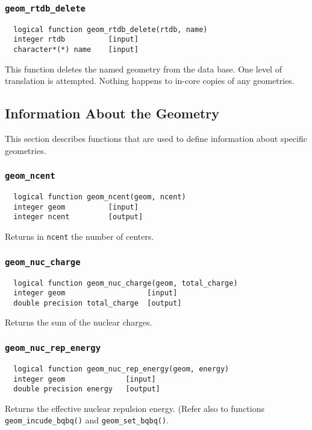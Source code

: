\subsubsection{{\tt geom\_rtdb\_delete}}
\begin{verbatim}
  logical function geom_rtdb_delete(rtdb, name)
  integer rtdb          [input]
  character*(*) name    [input]
\end{verbatim}
This function deletes the named geometry from the data base.  One level of
translation is attempted.  Nothing happens to in-core copies of any
geometries.

\subsection{Information About the Geometry}

This section describes functions that are used to define information about specific
geometries. 

\subsubsection{{\tt geom\_ncent}}
\begin{verbatim}
  logical function geom_ncent(geom, ncent)
  integer geom          [input]
  integer ncent         [output]
\end{verbatim}
Returns in {\tt ncent} the number of centers.

\subsubsection{{\tt geom\_nuc\_charge}}
\begin{verbatim}
  logical function geom_nuc_charge(geom, total_charge)
  integer geom                   [input]
  double precision total_charge  [output]
\end{verbatim}
Returns the sum of the nuclear charges.

\subsubsection{{\tt geom\_nuc\_rep\_energy}}
\begin{verbatim}
  logical function geom_nuc_rep_energy(geom, energy)
  integer geom              [input]
  double precision energy   [output]
\end{verbatim}
Returns the effective nuclear repulsion energy.  (Refer also to functions
\verb+geom_incude_bqbq()+  and
\verb+geom_set_bqbq()+.

